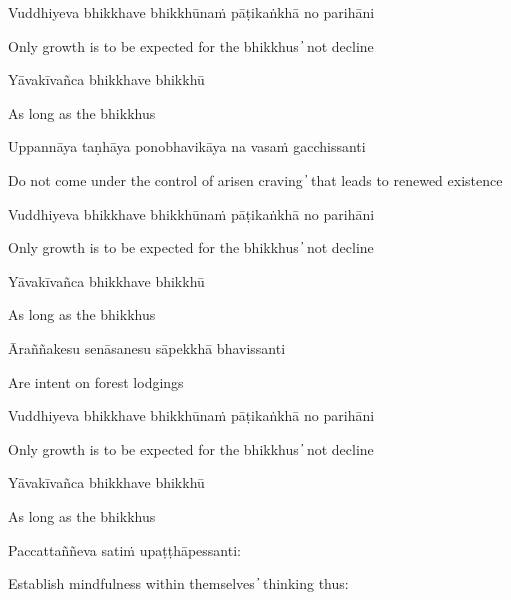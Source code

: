 Vuddhiyeva bhikkhave bhikkhūnaṁ pāṭikaṅkhā no parihāni

\begin{cprenglish}
  Only growth is to be expected for the bhikkhus  ̓  not decline
\end{cprenglish}

Yāvakīvañca bhikkhave bhikkhū

\begin{cprenglish}
  As long as the bhikkhus
\end{cprenglish}

Uppannāya taṇhāya ponobhavikāya na vasaṁ gacchissanti

\begin{cprenglish}
  Do not come under the control of arisen craving  ̓  that leads to renewed existence
\end{cprenglish}

Vuddhiyeva bhikkhave bhikkhūnaṁ pāṭikaṅkhā no parihāni

\begin{cprenglish}
  Only growth is to be expected for the bhikkhus  ̓  not decline
\end{cprenglish}

Yāvakīvañca bhikkhave bhikkhū

\begin{cprenglish}
  As long as the bhikkhus
\end{cprenglish}

Āraññakesu senāsanesu sāpekkhā bhavissanti

\begin{cprenglish}
  Are intent on forest lodgings
\end{cprenglish}

Vuddhiyeva bhikkhave bhikkhūnaṁ pāṭikaṅkhā no parihāni

\begin{cprenglish}
  Only growth is to be expected for the bhikkhus  ̓  not decline
\end{cprenglish}

Yāvakīvañca bhikkhave bhikkhū

\begin{cprenglish}
  As long as the bhikkhus
\end{cprenglish}

Paccattaññeva satiṁ upaṭṭhāpessanti:

\begin{cprenglish}
  Establish mindfulness within themselves  ̓  thinking thus:
\end{cprenglish}

